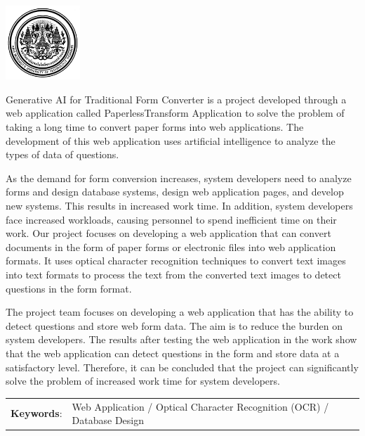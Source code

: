 \documentclass[12pt,oneside,openright,a4paper]{cpe-english-project}
\begin{document}
\pdfstringdefDisableCommands{\let\MakeUppercase\relax}
\begin{center}
  \includegraphics[width=2.8cm]{logo02.jpg}
\end{center}
\vspace*{-1cm}

\maketitlepage
\makesignaturepage 

\abstract

\setlength{\parindent}{15pt} Generative AI for Traditional Form Converter is a project developed through a web application called PaperlessTransform Application
to solve the problem of taking a long time to convert paper forms into web applications. The development of this web application uses artificial intelligence to analyze the types of data of questions.\par
As the demand for form conversion increases, system developers need to analyze forms and design database systems, design web application pages, and develop new systems.
This results in increased work time. In addition, system developers face increased workloads, causing personnel to spend inefficient time on their work.
Our project focuses on developing a web application that can convert documents in the form of paper forms or electronic files into web application formats.
It uses optical character recognition techniques to convert text images into text formats to process the text from the converted text images to detect questions in the form format.\par
The project team focuses on developing a web application that has the ability to detect questions and store web form data.
The aim is to reduce the burden on system developers. The results after testing the web application in the work show that the web application can detect questions in the form and store data at a satisfactory level. Therefore, it can be concluded that the project can significantly solve the problem of increased work time for system developers.

\begin{flushleft}
\begin{tabular*}{\textwidth}{@{}lp{}}
\textbf{Keywords}: & Web Application / Optical Character Recognition (OCR) / Database Design

\end{tabular*}
\end{flushleft}
\endabstract
\end{document}
